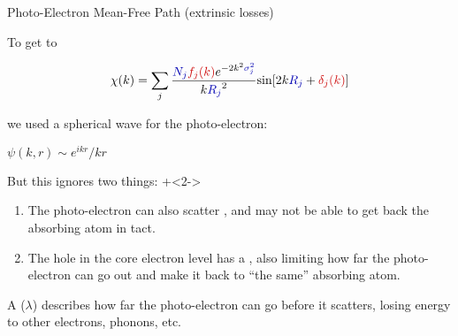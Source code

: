 
\begin{slide}{Photo-Electron Mean-Free Path (extrinsic losses)}

    \vmm
    \begin{cenpage}{125mm}

  To get to

    \[ \chi(k) = \sum_j {\frac{{\Blue{N_j}} {\Red{f_j(k)}}
        e^{-2k^2{\Blue{\sigma_j^2}}}}{k{\Blue{R_j}}^2}
      {\sin[{2k{\Blue{R_j}} + {\Red{\delta_j(k)}}] }}} \]

 we used a spherical wave for the photo-electron:

  \begin{center}
      \begin{minipage}{40mm}
        {$\displaystyle        \psi(k,r) \sim   {{e^{ikr}}/{kr}}  $}
      \end{minipage}
  \end{center}


  But this ignores two things:
  \vmm
\onslide+<2->
  
 \begin{minipage}{105mm}
   \begin{enumerate}
     \item     The photo-electron can also scatter {}, and may
       not be able to get back the absorbing atom in tact.
     \item   The hole in the core electron level has a {},
       also limiting how far the photo-electron can go out and make it back to
       ``the same'' absorbing atom.
     \end{enumerate}

     \vmm
     
  A {} ($\lambda$) describes how far the
  photo-electron can go before it scatters, losing energy to other
  electrons, phonons, etc.

  \end{minipage}

\end{cenpage}
  \vfill
  
\end{slide}

